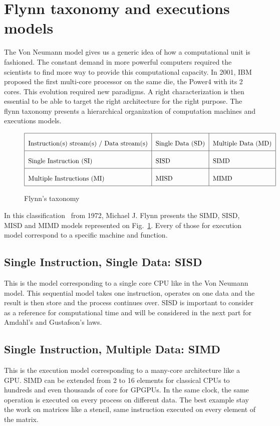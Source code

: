 \section{Flynn taxonomy and executions models}
The Von Neumann model gives us a generic idea of how a computational unit is fashioned. 
The constant demand in more powerful computers required the scientists to find more way to provide this computational capacity.
In 2001, IBM proposed the first multi-core processor on the same die, the Power4 with its 2 cores.
This evolution required new paradigms.
A right characterization is then essential to be able to target the right architecture for the right purpose. 
The flynn taxonomy presents a hierarchical organization of computation machines and executions models.

\begin{figure}
\begin{center}
\[\arraycolsep=1.4pt\def\arraystretch{2.2}
\begin{tabular}{| l | l | l |}
\hline
Instruction(s) stream(s) / Data stream(s)	& Single Data (SD) 	& Multiple Data (MD) \\
\hline
Single Instruction (SI)		& SISD			& SIMD \\
\hline
Multiple Instructions (MI) 	& MISD		& MIMD \\
\hline
\end{tabular}
\]
\end{center}
\caption{Flynn's taxonomy}
\label{fig:1_HPC:flynn_taxonomy}
\end{figure}

In this classification~\cite{flynn1972some} from 1972, Michael J. Flynn presents the SIMD, SISD, MISD and MIMD models represented on Fig.~\ref{fig:1_HPC:flynn_taxonomy}.
Every of those for execution model correspond to a specific machine and function.

\subsection{Single Instruction, Single Data: SISD}
This is the model corresponding to a single core CPU like in the Von Neumann model. 
This sequential model takes one instruction, operates on one data and the result is then store and the process continues over. 
SISD is important to consider as a reference for computational time and will be considered in the next part for Amdahl's and Gustafson's laws.

\subsection{Single Instruction, Multiple Data: SIMD}
This is the execution model corresponding to a many-core architecture like a GPU. 
SIMD can be extended from 2 to 16 elements for classical CPUs to hundreds and even thousands of core for GPGPUs. 
In the same clock, the same operation is executed on every process on different data. 
The best example stay the work on matrices like a stencil, same instruction executed on every element of the matrix. 

